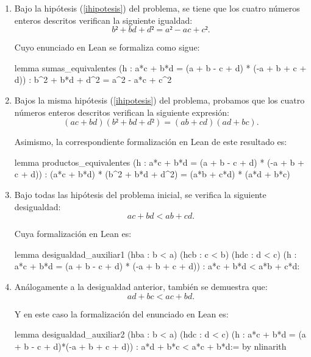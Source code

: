 \begin{enumerate}
\item Bajo la hipótesis (\ref{ihipotesis}) del problema, se tiene
  que los cuatro números enteros descritos verifican la siguiente
  igualdad:
  \begin{equation*}
    b²+bd+d²=a²-ac+c².
  \end{equation*}

  Cuyo enunciado en Lean se formaliza como sigue:
  \begin{leancode}
  lemma sumas_equivalentes
    (h : a*c + b*d = (a + b - c + d) * (-a + b + c + d))
    : b^2 + b*d + d^2 = a^2 - a*c + c^2
  \end{leancode}

\item Bajos la misma hipótesis (\ref{ihipotesis}) del problema,
  probamos que los cuatro números enteros descritos verifican la
  siguiente expresión:
  \begin{equation*}
    (ac+bd)(b²+bd+d²)=(ab+cd)(ad+bc).
  \end{equation*}

  Asimismo, la correspondiente formalización en Lean de este resultado
  es:
  \begin{leancode}
  lemma productos_equivalentes
    (h : a*c + b*d = (a + b - c + d) * (-a + b + c + d))
    : (a*c + b*d) * (b^2 + b*d + d^2) = (a*b + c*d) * (a*d + b*c)
  \end{leancode}

\item Bajo todas las hipótesis del problema inicial, se verifica la
  siguiente desigualdad:
  \begin{equation*}
    ac+bd<ab+cd.
  \end{equation*}

  Cuya formalización en Lean es:
  \begin{leancode}
  lemma desigualdad_auxiliar1
    (hba : b < a)
    (hcb : c < b)
    (hdc : d < c)
    (h : a*c + b*d = (a + b - c + d) * (-a + b + c + d))
    : a*c + b*d < a*b + c*d:
  \end{leancode}

\item Análogamente a la desigualdad anterior, también se demuestra que:
  \begin{equation*}
    ad+bc<ac+bd.
  \end{equation*}

  Y en este caso la formalización del enunciado en Lean es:
  \begin{leancode}
  lemma desigualdad_auxiliar2
    (hba : b < a)
    (hdc : d < c)
    (h : a*c + b*d = (a + b - c + d)*(-a + b + c + d))
    : a*d + b*c < a*c + b*d:=
    by nlinarith
  \end{leancode}


\end{enumerate}

